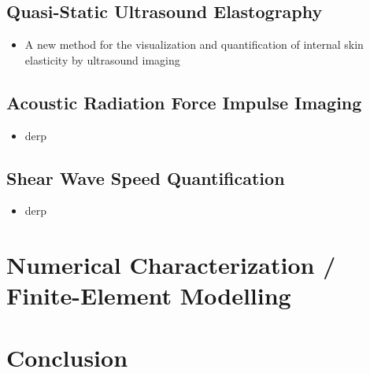 		\subsection{Quasi-Static Ultrasound Elastography}
			\begin{itemize}
				\item A new method for the visualization and quantification of internal skin elasticity by ultrasound imaging \cite{osanai11}
			\end{itemize}

		\subsection{Acoustic Radiation Force Impulse Imaging}
			\begin{itemize}
				\item derp
			\end{itemize}

		\subsection{Shear Wave Speed Quantification}
			\begin{itemize}
				\item derp
			\end{itemize}

	\section{Numerical Characterization / Finite-Element Modelling}
		\lipsum[1]

	\section{Conclusion}
		\lipsum[1]

	\cleardoublepage


	\printbibliography[heading=subbibliography]